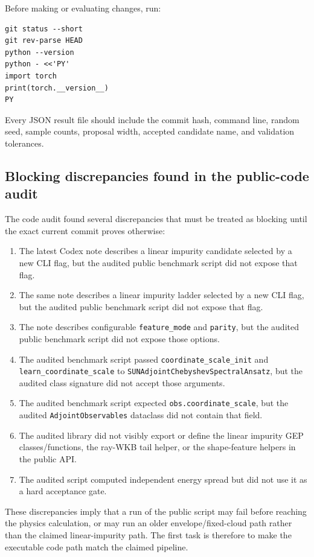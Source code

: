 \documentclass[11pt]{article}
\begin{document}
Before making or evaluating changes, run:

\begin{lstlisting}[style=bashstyle]
git status --short
git rev-parse HEAD
python --version
python - <<'PY'
import torch
print(torch.__version__)
PY
\end{lstlisting}

Every JSON result file should include the commit hash, command line, random seed, sample counts, proposal width, accepted candidate name, and validation tolerances.


\subsection{Blocking discrepancies found in the public-code audit}

The code audit found several discrepancies that must be treated as blocking until the exact current commit proves otherwise:
\begin{enumerate}
\item The latest Codex note describes a linear impurity candidate selected by a new CLI flag, but the audited public benchmark script did not expose that flag.
\item The same note describes a linear impurity ladder selected by a new CLI flag, but the audited public benchmark script did not expose that flag.
\item The note describes configurable \texttt{feature\_mode} and \texttt{parity}, but the audited public benchmark script did not expose those options.
\item The audited benchmark script passed \texttt{coordinate\_scale\_init} and
\texttt{learn\_coordinate\_scale} to \texttt{SUNAdjointChebyshevSpectralAnsatz}, but the audited class signature did not accept those arguments.
\item The audited benchmark script expected \texttt{obs.coordinate\_scale}, but the audited
\texttt{AdjointObservables} dataclass did not contain that field.
\item The audited library did not visibly export or define the linear impurity GEP classes/functions, the ray-WKB tail helper, or the shape-feature helpers in the public API.
\item The audited script computed independent energy spread but did not use it as a hard acceptance gate.
\end{enumerate}

These discrepancies imply that a run of the public script may fail before reaching the physics calculation, or may run an older envelope/fixed-cloud path rather than the claimed linear-impurity path.  The first task is therefore to make the executable code path match the claimed pipeline.
\end{document}
